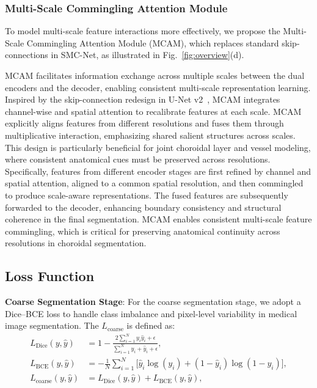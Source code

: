 \documentclass[lettersize,journal]{IEEEtran}
\begin{document}
\subsubsection{Multi-Scale Commingling Attention Module}
{\color{red}
To model multi-scale feature interactions more effectively, we propose the Multi-Scale Commingling Attention Module (MCAM), which replaces standard skip-connections in SMC-Net, as illustrated in Fig.~\ref{fig:overview}(d).

MCAM facilitates information exchange across multiple scales between the dual encoders and the decoder, enabling consistent multi-scale representation learning.
Inspired by the skip-connection redesign in U-Net v2~\cite{unetv2}, MCAM integrates channel-wise and spatial attention to recalibrate features at each scale.
MCAM explicitly aligns features from different resolutions and fuses them through multiplicative interaction, emphasizing shared salient structures across scales.
This design is particularly beneficial for joint choroidal layer and vessel modeling, where consistent anatomical cues must be preserved across resolutions.
Specifically, features from different encoder stages are first refined by channel and spatial attention, aligned to a common spatial resolution, and then commingled to produce scale-aware representations.
The fused features are subsequently forwarded to the decoder, enhancing boundary consistency and structural coherence in the final segmentation. MCAM enables consistent multi-scale feature commingling, which is critical for preserving anatomical continuity across resolutions in choroidal segmentation.}

\subsection{Loss Function}
\textbf{Coarse Segmentation Stage}: For the coarse segmentation stage, we adopt a Dice--BCE loss to handle class imbalance and pixel-level variability in medical image segmentation. The $L_{\text{coarse}}$ is defined as:
\begin{align}
L_{\text{Dice}}(y,\hat{y}) &= 1 - \frac{2\sum_{i=1}^{N} y_i \hat{y}_i + \epsilon}{\sum_{i=1}^{N} y_i + \hat{y}_i + \epsilon}, \\
L_{\text{BCE}}(y,\hat{y}) &= -\frac{1}{N}\sum_{i=1}^{N} \big[\hat{y}_i \log(y_i) + (1-\hat{y}_i)\log(1-y_i)\big], \\
L_{\text{coarse}}(y,\hat{y}) &= L_{\text{Dice}}(y,\hat{y}) + L_{\text{BCE}}(y,\hat{y}),
\label{eq:loss_coarse}
\end{align}
\end{document}
